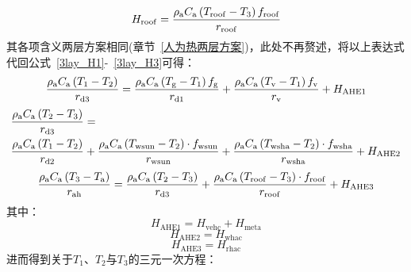 %
\begin{equation}\label{urban_Hroof_3}
  H_{\mathrm{roof}} = \frac{\rho _{\rm a} C_{\mathrm a} \left( T_{\mathrm{roof}} - T_{3} \right) f_{\mathrm{roof}}}{r_{\mathrm{roof}}}
\end{equation}
其各项含义两层方案相同(章节~\ref{人为热两层方案})，此处不再赘述，将以上表达式代回公式~\eqref{3lay_H1}-~\eqref{3lay_H3}可得：
%
\begin{equation}
  \frac{\rho _{\rm a} C_{\mathrm a} \left( T_{1} - T_{2} \right)}{r_{\mathrm{d3}}} = \frac{\rho _{\rm a} C_{\mathrm a} \left( T_{\mathrm{g}} - T_{1} \right) f_{\mathrm{g}}}{r_{\mathrm{d1}}} + \frac{\rho _{\rm a} C_{\mathrm a} \left( T_{\mathrm{v}} - T_{1} \right) f_{\rm v}}{r_{\mathrm{v}}} + H_{\mathrm{AHE1}}
\end{equation}
%
\begin{equation}
  \begin{split}
    & \frac{\rho _{\rm a} C_{\mathrm a} \left( T_{2} - T_{3} \right)}{r_{\mathrm{d3}}} = \\
    & \frac{\rho _{\rm a} C_{\mathrm a} \left( T_{\mathrm{1}} - T_{2} \right) }{r_{\mathrm{d2}}} + \frac{\rho _{\rm a} C_{\mathrm a} \left( T_{\mathrm{wsun}} - T_{2} \right) \cdot f_{\mathrm{wsun}}}{r_{\mathrm{wsun}}} + \frac{\rho _{\rm a} C_{\mathrm a} \left( T_{\mathrm{wsha}} - T_{2} \right) \cdot f_{\mathrm{wsha}}}{r_{\mathrm{wsha}}} + H_{\mathrm{AHE2}}
  \end{split}
\end{equation}
%
\begin{equation}
  \begin{split}
    \frac{\rho _{\rm a} C_{\mathrm a} \left( T_{3} - T_{\rm a} \right)}{r_{\mathrm{ah}}} =
    \frac{\rho _{\rm a} C_{\mathrm a} \left( T_{2} - T_{3} \right)}{r_{\mathrm{d3}}} + \frac{\rho _{\rm a} C_{\mathrm a} \left( T_{\mathrm{roof}} - T_{3} \right)\cdot f_{\mathrm{roof}}}{r_{\mathrm{roof}}} + H_{\mathrm{AHE3}}
  \end{split}
\end{equation}
其中：
\begin{equation}
  H_{\mathrm{AHE1}} = H_{\mathrm{vehc}} + H_{\mathrm{meta}}
\end{equation}
\begin{equation}
  H_{\mathrm{AHE2}} = H_{\mathrm{whac}}
\end{equation}
%
\begin{equation}
  H_{\mathrm{AHE3}} = H_{\mathrm{rhac}}
\end{equation}
进而得到关于$T_{1}$、$T_{2}$与$T_{3}$的三元一次方程：

